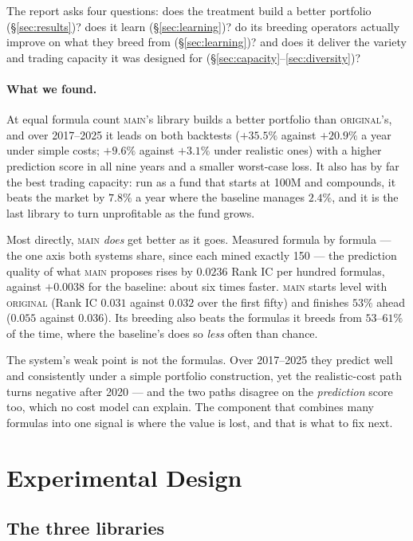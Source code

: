 \documentclass[11pt]{article}
\newcommand{\main}{\textsc{main}}
\newcommand{\orig}{\textsc{original}}
\begin{document}
\noindent The report asks four questions: does the treatment build a better portfolio
(\S\ref{sec:results})? does it learn (\S\ref{sec:learning})? do its breeding operators
actually improve on what they breed from (\S\ref{sec:learning})? and does it deliver
the variety and trading capacity it was designed for
(\S\ref{sec:capacity}--\ref{sec:diversity})?

\paragraph{What we found.}
At equal formula count \main{}'s library builds a better portfolio than \orig{}'s, and
over 2017--2025 it leads on both backtests ($+35.5\%$ against $+20.9\%$ a year under
simple costs; $+9.6\%$ against $+3.1\%$ under realistic ones) with a higher prediction
score in all nine years and a smaller worst-case loss. It also has by far the best
trading capacity: run as a fund that starts at 100M and compounds, it beats the market
by $7.8\%$ a year where the baseline manages $2.4\%$, and it is the last library to
turn unprofitable as the fund grows.

Most directly, \main{} \emph{does} get better as it goes. Measured formula by formula
--- the one axis both systems share, since each mined exactly 150 --- the prediction
quality of what \main{} proposes rises by $0.0236$ Rank IC per hundred formulas,
against $+0.0038$ for the baseline: about six times faster. \main{} starts level with
\orig{} (Rank IC $0.031$ against $0.032$ over the first fifty) and finishes $53\%$
ahead ($0.055$ against $0.036$). Its breeding also beats the formulas it breeds from
$53$--$61\%$ of the time, where the baseline's does so \emph{less} often than chance.

The system's weak point is not the formulas. Over 2017--2025 they predict well and
consistently under a simple portfolio construction, yet the realistic-cost path turns
negative after 2020 --- and the two paths disagree on the \emph{prediction} score too,
which no cost model can explain. The component that combines many formulas into one
signal is where the value is lost, and that is what to fix next.

\section{Experimental Design}
\label{sec:design}

\subsection{The three libraries}
\end{document}
